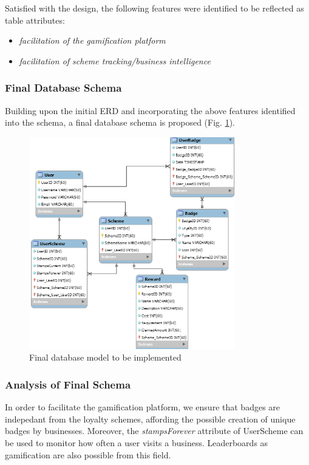 Satisfied with the design, the following features were identified to be reflected as table attributes:
\begin{itemize}
  \item \textit{facilitation of the gamification platform}
  \item \textit{facilitation of scheme tracking/business intelligence}
\end{itemize}

\newpage
\subsubsection{Final Database Schema}
Building upon the initial ERD and incorporating the above features identified into the schema, a final database schema is proposed  (Fig. \ref{fig:finaldb}). 

\begin{figure}[H]
  \centering
    \includegraphics[width=0.8\textwidth]{img/architecture.png}
      \caption{Final database model to be implemented}
      \label{fig:finaldb}
\end{figure}

\subsubsection{Analysis of Final Schema}
In order to facilitate the gamification platform, we ensure that badges are indepedant from the loyalty schemes, affording the possible creation of unique badges by businesses. Moreover, the \emph{stampsForever} attribute of UserScheme can be used to monitor how often a user visits a business. Leaderboards as gamification are also possible from this field.

